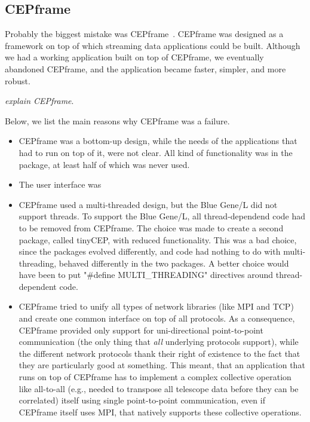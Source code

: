 \documentclass[article]{sig-alternate}
\begin{document}
\subsection{CEPframe}

Probably the biggest mistake was CEPframe~\cite{XXX}.
CEPframe was designed as a framework on top of which streaming data
applications could be built.
Although we had a working application built on top of CEPframe, we eventually
abandoned CEPframe, and the application became faster, simpler, and more
robust.

\emph{explain CEPframe}.

Below, we list the main reasons why CEPframe was a failure.

\begin{itemize}
\item
CEPframe was a bottom-up design, while the needs of the applications that
had to run on top of it, were not clear.
All kind of functionality was in the package, at least half of which was
never used.

\item
The user interface was 

\item
CEPframe used a multi-threaded design, but the Blue Gene/L did not support
threads.
To support the Blue Gene/L, all thread-dependend code had to be removed
from CEPframe.
The choice was made to create a second package, called tinyCEP, with reduced
functionality.
This was a bad choice, since the packages evolved differently, and code
had nothing to do with multi-threading, behaved differently in the two
packages.
A better choice would have been to put "\#define MULTI\_THREADING" directives
around thread-dependent code.

\item
CEPframe tried to unify all types of network libraries (like MPI and TCP)
and create one common interface on top of all protocols.
As a consequence, CEPframe provided only support for uni-directional
point-to-point communication (the only thing that \emph{all\/} underlying
protocols support), while the different network protocols thank
their right of existence to the fact that they are particularly good at
something.
This meant, that an application that runs on top of CEPframe has to implement
a complex collective operation like all-to-all (e.g., needed to transpose all
telescope data before they can be correlated) itself using single
point-to-point communication, even if CEPframe itself uses MPI, that natively
supports these collective operations.


\end{itemize}
\end{document}
